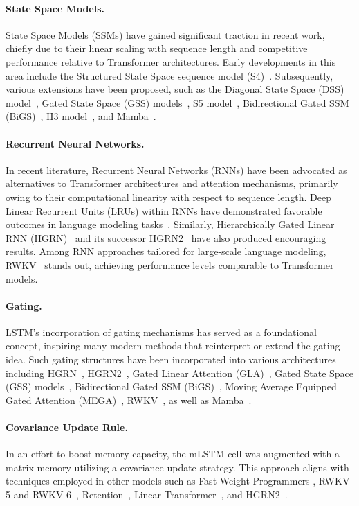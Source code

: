 \paragraph{State Space Models.} State Space Models (SSMs) have gained significant traction in recent work, chiefly due to their linear scaling with sequence length and competitive performance relative to Transformer architectures. Early developments in this area include the Structured State Space sequence model (S4)~\citep{Gu:21}. Subsequently, various extensions have been proposed, such as the Diagonal State Space (DSS) model~\citep{Gupta:22}, Gated State Space (GSS) models~\citep{Mehta:22}, S5 model~\citep{Smith:22}, Bidirectional Gated SSM (BiGS)~\citep{Wang:22}, H3 model~\citep{Fu:23}, and Mamba~\citep{Gu:24arxiv}.

\paragraph{Recurrent Neural Networks.} In recent literature, Recurrent Neural Networks (RNNs) have been advocated as alternatives to Transformer architectures and attention mechanisms, primarily owing to their computational linearity with respect to sequence length. Deep Linear Recurrent Units (LRUs) within RNNs have demonstrated favorable outcomes in language modeling tasks~\citep{Orvieto:23, De:24arxiv}. Similarly, Hierarchically Gated Linear RNN (HGRN)~\citep{Qin:23} and its successor HGRN2~\citep{Qin:24arxiv} have also produced encouraging results. Among RNN approaches tailored for large-scale language modeling, RWKV~\citep{Peng:23arxivshort,Peng:24arxivshort} stands out, achieving performance levels comparable to Transformer models.

\paragraph{Gating.}
LSTM's incorporation of gating mechanisms has served as a foundational concept, inspiring many modern methods that reinterpret or extend the gating idea. Such gating structures have been incorporated into various architectures including HGRN~\citep{Qin:23}, HGRN2~\citep{Qin:24arxiv}, Gated Linear Attention (GLA)~\citep{Yang:23arxiv}, Gated State Space (GSS) models~\citep{Mehta:22}, Bidirectional Gated SSM (BiGS)~\citep{Wang:22}, Moving Average Equipped Gated Attention (MEGA)~\citep{Ma:22}, RWKV~\citep{Peng:23arxivshort}, as well as Mamba~\citep{Gu:24arxiv}.

\paragraph{Covariance Update Rule.}
In an effort to boost memory capacity, the mLSTM cell was augmented with a matrix memory utilizing a covariance update strategy. This approach aligns with techniques employed in other models such as Fast Weight Programmers \citep{Schmidhuber:92ncfastweights,Schlag:21}, RWKV-5 and RWKV-6~\citep{Peng:24arxivshort}, Retention~\citep{Sun:23arxiv}, Linear Transformer~\citep{Katharopoulos:20}, and HGRN2~\citep{Qin:24arxiv}.

